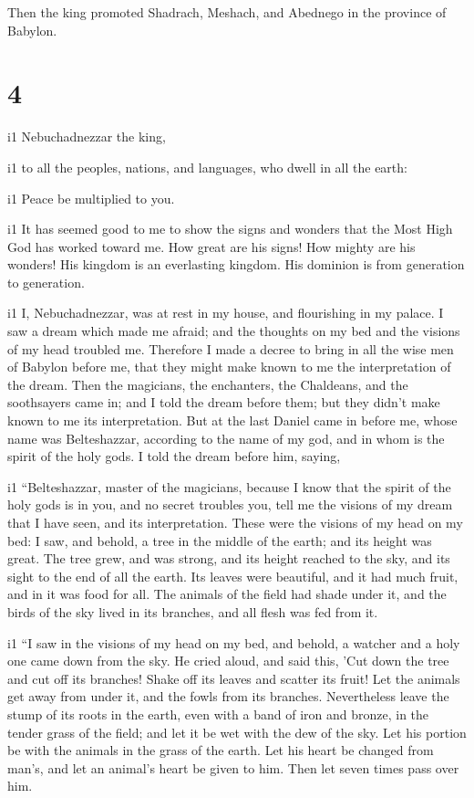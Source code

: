  Then the king promoted Shadrach, Meshach, and Abednego
in the province of Babylon.

\hypertarget{section-3}{%
\section{4}\label{section-3}}

i1 Nebuchadnezzar the king,

i1 to all the peoples, nations, and languages, who dwell in all the
earth:

i1 Peace be multiplied to you.

i1 It has seemed good to me to show the signs and wonders
that the Most High God has worked toward me.  How great
are his signs! How mighty are his wonders! His kingdom is an everlasting
kingdom. His dominion is from generation to generation.

i1 I, Nebuchadnezzar, was at rest in my house, and
flourishing in my palace.  I saw a dream which made me
afraid; and the thoughts on my bed and the visions of my head troubled
me.  Therefore I made a decree to bring in all the wise
men of Babylon before me, that they might make known to me the
interpretation of the dream.  Then the magicians, the
enchanters, the Chaldeans, and the soothsayers came in; and I told the
dream before them; but they didn't make known to me its interpretation.
 But at the last Daniel came in before me, whose name was
Belteshazzar, according to the name of my god, and in whom is the spirit
of the holy gods. I told the dream before him, saying,

i1 ``Belteshazzar, master of the magicians, because I know
that the spirit of the holy gods is in you, and no secret troubles you,
tell me the visions of my dream that I have seen, and its
interpretation.  These were the visions of my head on my
bed: I saw, and behold, a tree in the middle of the earth; and its
height was great.  The tree grew, and was strong, and its
height reached to the sky, and its sight to the end of all the earth.
 Its leaves were beautiful, and it had much fruit, and in
it was food for all. The animals of the field had shade under it, and
the birds of the sky lived in its branches, and all flesh was fed from
it.

i1 ``I saw in the visions of my head on my bed, and
behold, a watcher and a holy one came down from the sky. 
He cried aloud, and said this, 'Cut down the tree and cut off its
branches! Shake off its leaves and scatter its fruit! Let the animals
get away from under it, and the fowls from its branches. 
Nevertheless leave the stump of its roots in the earth, even with a band
of iron and bronze, in the tender grass of the field; and let it be wet
with the dew of the sky. Let his portion be with the animals in the
grass of the earth.  Let his heart be changed from man's,
and let an animal's heart be given to him. Then let seven times pass
over him.


